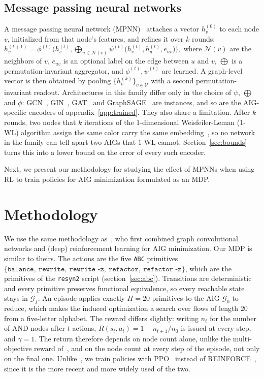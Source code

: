 \documentclass{article}
\begin{document}
\subsection{Message passing neural networks}\label{sec:mpnn}
A message passing neural network (MPNN)~\cite{mpnn} attaches a vector $h_v^{(0)}$ to each node $v$, initialized from that node's features, and refines it over $k$ rounds: {\small$h_v^{(t+1)} = \phi^{(t)}\Big(h_v^{(t)}, \textstyle\bigoplus_{u \in \mathcal{N}(v)} \psi^{(t)}\big(h_v^{(t)}, h_u^{(t)}, e_{uv}\big)\Big),$}
where $\mathcal{N}(v)$ are the neighbors of $v$, $e_{uv}$ is an optional label on the edge between $u$ and $v$, $\bigoplus$ is a permutation-invariant aggregator, and $\phi^{(t)}, \psi^{(t)}$ are learned.
A graph-level vector is then obtained by pooling $\{h_v^{(k)}\}_{v\in \mathcal{V}}$ with a second permutation-invariant readout.
Architectures in this family differ only in the choice of $\psi$, $\bigoplus$ and $\phi$: GCN~\cite{gcn}, GIN~\cite{gin}, GAT~\cite{gat} and GraphSAGE~\cite{graphsage} are instances, and so are the AIG-specific encoders of appendix~\ref{app:trained}.
They also share a limitation. After $k$ rounds, two nodes that $k$ iterations of the $1$-dimensional Weisfeiler-Leman (1-WL) algorithm assign the same color carry the same embedding~\cite{gin,wlgnn,graphtester}, so no network in the family can tell apart two AIGs that $1$-WL cannot.
Section~\ref{sec:bounds} turns this into a lower bound on the error of every such encoder.

Next, we present our methodology for studying the effect of MPNNs when using RL to train policies for AIG minimization formulated as an MDP.

\section{Methodology}\label{sec:method}%
\label{sec:mdp-instance}\label{sec:features}\label{sec:repr}\label{sec:rl-method}%
We use the same methodology as~\citet{rl-gnn1}, who first combined graph convolutional networks and (deep) reinforcement learning for AIG minimization.
Our MDP is similar to theirs.
The actions are the five \texttt{ABC} primitives $\{\texttt{balance},\ \texttt{rewrite},\ \texttt{rewrite -z},\ \texttt{refactor},\ \texttt{refactor -z}\}$, which are the primitives of the \texttt{resyn2} script (section~\ref{sec:abc}).
Transitions are deterministic and every primitive preserves functional equivalence, so every reachable state stays in $\mathcal{G}_f$.
An episode applies exactly $H = 20$ primitives to the AIG $\mathcal{G}_0$ to reduce, which makes the induced optimization a search over flows of length $20$ from a five-letter alphabet.
The reward differs slightly: writing $n_t$ for the number of AND nodes after $t$ actions, $R(s_t, a_t) = 1 - n_{t+1}/n_0$ is issued at every step, and $\gamma = 1$.
The return therefore depends on node count alone, unlike the multi-objective reward of~\citet{rl-logic1}, and on the node count at every step of the episode, not only on the final one.
Unlike~\citet{rl-gnn1}, we train policies with PPO~\cite{ppo} instead of REINFORCE~\cite{reinforce}, since it is the more recent and more widely used of the two.
\end{document}
